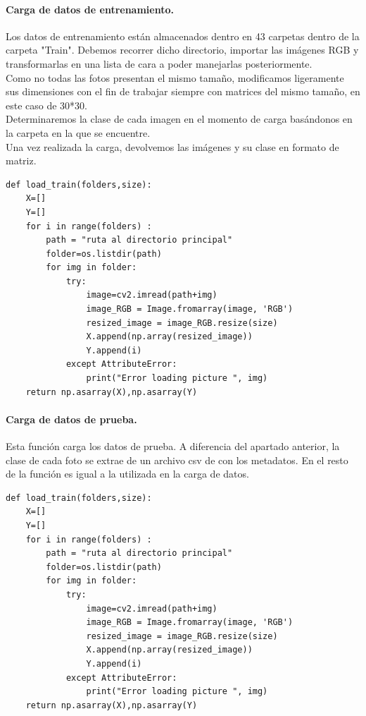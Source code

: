 \documentclass[a4paper,11pt]{article}
\begin{document}
\paragraph{Carga de datos de entrenamiento.}
Los datos de entrenamiento están almacenados dentro en 43 carpetas dentro de la carpeta "Train". Debemos recorrer dicho directorio, importar las imágenes RGB y transformarlas en una lista de cara a poder manejarlas posteriormente.\\

\noindent
Como no todas las fotos presentan el mismo tamaño, modificamos ligeramente sus dimensiones con el fin de trabajar siempre con matrices del mismo tamaño, en este caso de 30*30.\\

\noindent
Determinaremos la clase de cada imagen en el momento de carga basándonos en la carpeta en la que se encuentre. \\

\noindent
Una vez realizada la carga, devolvemos las imágenes y su clase en formato de matriz.
\begin{lstlisting}
def load_train(folders,size):
    X=[]
    Y=[]
    for i in range(folders) :
        path = "ruta al directorio principal"
        folder=os.listdir(path)
        for img in folder:
            try:
                image=cv2.imread(path+img)
                image_RGB = Image.fromarray(image, 'RGB')
                resized_image = image_RGB.resize(size)
                X.append(np.array(resized_image))
                Y.append(i)
            except AttributeError:
                print("Error loading picture ", img)
    return np.asarray(X),np.asarray(Y)
\end{lstlisting}

\paragraph{Carga de datos de prueba.}
Esta función carga los datos de prueba. A diferencia del apartado anterior, la clase de cada foto se extrae de un archivo csv de con los metadatos. En el resto de la función es igual a la utilizada en la carga de datos.

\begin{lstlisting}
def load_train(folders,size):
    X=[]
    Y=[]
    for i in range(folders) :
        path = "ruta al directorio principal"
        folder=os.listdir(path)
        for img in folder:
            try:
                image=cv2.imread(path+img)
                image_RGB = Image.fromarray(image, 'RGB')
                resized_image = image_RGB.resize(size)
                X.append(np.array(resized_image))
                Y.append(i)
            except AttributeError:
                print("Error loading picture ", img)
    return np.asarray(X),np.asarray(Y)
\end{lstlisting}
\end{document}
